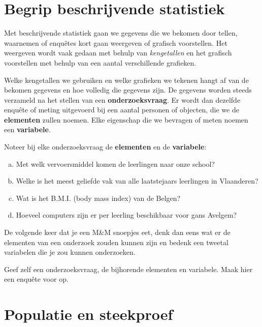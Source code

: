 \documentclass[12pt,twoside,a4paper]{article}
\begin{document}
\pagestyle{fancy}
\fancyhead[RE,LO]{}

\cleardoublepage
\section{Begrip beschrijvende statistiek}

Met beschrijvende statistiek gaan we gegevens die we bekomen door tellen, waarnemen of enquêtes kort gaan weergeven of grafisch voorstellen. Het weergeven wordt vaak gedaan met behulp van {\em kengetallen} en het grafisch voorstellen met behulp van een aantal verschillende grafieken.

Welke kengetallen we gebruiken en welke grafieken we tekenen hangt af van de bekomen gegevens en hoe volledig die gegevens zijn. De gegevens worden steeds verzameld na het stellen van een {\bf onderzoeksvraag}. Er wordt dan dezelfde enquête of meting uitgevoerd bij een aantal personen of objecten, die we de {\bf elementen} zullen noemen. Elke eigenschap die we bevragen of meten noemen een {\bf variabele}.

\begin{oefening}
Noteer bij elke onderzoeksvraag de {\bf elementen} en de {\bf variabele}:
\begin{enumerate}[(a)]
  \item Met welk vervoersmiddel komen de leerlingen naar onze school?
  \item Welke is het meest geliefde vak van alle laatstejaars leerlingen in Vlaanderen?
  \item Wat is het B.M.I. (body mass index) van de Belgen?
  \item Hoeveel computers zijn er per leerling beschikbaar voor gans Avelgem?
\end{enumerate}
\end{oefening}

\begin{oefening}
  De volgende keer dat je een M\&M snoepjes eet, denk dan eens wat er de elementen van een onderzoek zouden kunnen zijn en bedenk een tweetal variabelen die je zou kunnen onderzoeken.
\end{oefening}

\begin{oefening}
Geef zelf een onderzoeksvraag, de bijhorende elementen en variabele. Maak hier een enquête voor op.
\end{oefening}

\cleardoublepage
\section{Populatie en steekproef}
\end{document}
